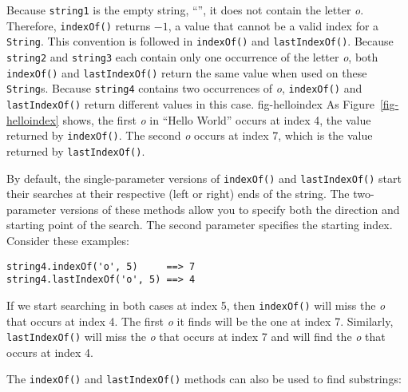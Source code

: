 \noindent Because {\tt string1} is the empty string, ``'', it does not
contain the letter {\it o}. Therefore, {\tt indexOf()} returns $-1$, a
value that cannot be a valid index for a {\tt String}. This convention
is followed in {\tt indexOf()} and {\tt lastIndexOf()}.  Because
{\tt string2} and {\tt string3} each contain only one occurrence of the
letter {\it o}, both {\tt indexOf()} and {\tt lastIndexOf()} return the
same value when used on these {\tt String}s.  Because {\tt string4}
contains two occurrences of {\it o}, {\tt indexOf()} and
{\tt lastIndexOf()} return different values in this case.
{fig-helloindex}
As Figure~\ref{fig-helloindex} shows, the first {\it o} in ``Hello World''
occurs at index 4, the value returned by {\tt indexOf()}. The second
{\it o} occurs at index 7, which is the value returned by
{\tt lastIndexOf()}.

By default, the single-parameter versions of {\tt indexOf()} and
{\tt last\-IndexOf()} start their searches at their respective (left or
right) ends of the string.   The two-parameter versions of these
methods allow you to specify both the direction and starting point of
the search.   The second parameter specifies the starting
index.  Consider these examples:

\begin{jjjlisting}
\begin{lstlisting}
string4.indexOf('o', 5)     ==> 7
string4.lastIndexOf('o', 5) ==> 4
\end{lstlisting}
\end{jjjlisting}

\noindent If we start searching in both cases at index 5, then
{\tt indexOf()} will miss the {\it o} that occurs at index 4. The first
{\it o} it finds will be the one at index 7. Similarly,
{\tt lastIndexOf()} will miss the {\it o} that occurs at index 7 and will find
the {\it o} that occurs at index 4.

The {\tt indexOf()} and {\tt lastIndexOf()} methods can also be used
to find substrings:


